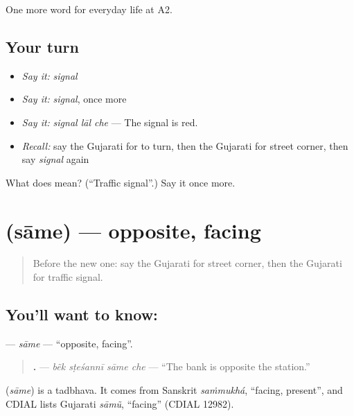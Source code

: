 \begin{grammarlens}[title={What you've built}]
One more word for everyday life at A2.
\end{grammarlens}

\subsection*{Your turn}
\begin{itemize}
\raggedright
  \item \emph{Say it:} \emph{signal}
  \item \emph{Say it:} \emph{signal}, once more
  \item \emph{Say it:} \emph{signal lāl che} — The signal is red.
  \item \emph{Recall:} say the Gujarati for to turn, then the Gujarati for street corner, then say \emph{signal} again
\end{itemize}

\begin{tcolorbox}[breakable,colback=teal!4,colframe=teal!35!black,title={Before you move on}]
What does  mean? (\textquotedblleft{}Traffic signal\textquotedblright{}.) Say it once more.
\end{tcolorbox}
\section[\texorpdfstring{\gu{સામે} (sāme)}{સામે (sāme)}]{ (sāme) — opposite, facing}

\label{lesson:GU-C194-same}



\begin{quote}
Before the new one: say the Gujarati for street corner, then the Gujarati for traffic signal.
\end{quote}

\subsection*{You'll want to know: }
\textbf{} — \emph{sāme} — \textquotedblleft{}opposite, facing\textquotedblright{}.

\begin{quote}
\textbf{   .} — \emph{bẽk sṭeśannī sāme che} — \textquotedblleft{}The bank is opposite the station.\textquotedblright{}
\end{quote}

\begin{cousinweb}
\textbf{} (\emph{sāme}) is a tadbhava. It comes from Sanskrit \emph{saṁmukhá}, \textquotedblleft{}facing, present\textquotedblright{}, and CDIAL lists Gujarati \emph{sāmũ}, \textquotedblleft{}facing\textquotedblright{} (CDIAL 12982).
\end{cousinweb}

